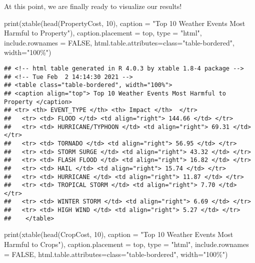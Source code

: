 \documentclass[
]{article}
\newenvironment{Shaded}{\begin{snugshade}}{\end{snugshade}}
\newcommand{\AttributeTok}[1]{\textcolor[rgb]{0.77,0.63,0.00}{#1}}
\newcommand{\ConstantTok}[1]{\textcolor[rgb]{0.00,0.00,0.00}{#1}}
\newcommand{\DecValTok}[1]{\textcolor[rgb]{0.00,0.00,0.81}{#1}}
\newcommand{\FunctionTok}[1]{\textcolor[rgb]{0.00,0.00,0.00}{#1}}
\newcommand{\NormalTok}[1]{#1}
\newcommand{\StringTok}[1]{\textcolor[rgb]{0.31,0.60,0.02}{#1}}
\begin{document}
At this point, we are finally ready to visualize our results!

\begin{Shaded}
\begin{Highlighting}[]
\FunctionTok{print}\NormalTok{(}\FunctionTok{xtable}\NormalTok{(}\FunctionTok{head}\NormalTok{(PropertyCost, }\DecValTok{10}\NormalTok{),}
             \AttributeTok{caption =} \StringTok{"Top 10 Weather Events Most Harmful to Property"}\NormalTok{),}
             \AttributeTok{caption.placement =} \StringTok{\textquotesingle{}top\textquotesingle{}}\NormalTok{,}
             \AttributeTok{type =} \StringTok{"html"}\NormalTok{,}
             \AttributeTok{include.rownames =} \ConstantTok{FALSE}\NormalTok{,}
             \AttributeTok{html.table.attributes=}\StringTok{\textquotesingle{}class="table{-}bordered", width="100\%"\textquotesingle{}}\NormalTok{)}
\end{Highlighting}
\end{Shaded}

\begin{verbatim}
## <!-- html table generated in R 4.0.3 by xtable 1.8-4 package -->
## <!-- Tue Feb  2 14:14:30 2021 -->
## <table class="table-bordered", width="100%">
## <caption align="top"> Top 10 Weather Events Most Harmful to Property </caption>
## <tr> <th> EVENT_TYPE </th> <th> Impact </th>  </tr>
##   <tr> <td> FLOOD </td> <td align="right"> 144.66 </td> </tr>
##   <tr> <td> HURRICANE/TYPHOON </td> <td align="right"> 69.31 </td> </tr>
##   <tr> <td> TORNADO </td> <td align="right"> 56.95 </td> </tr>
##   <tr> <td> STORM SURGE </td> <td align="right"> 43.32 </td> </tr>
##   <tr> <td> FLASH FLOOD </td> <td align="right"> 16.82 </td> </tr>
##   <tr> <td> HAIL </td> <td align="right"> 15.74 </td> </tr>
##   <tr> <td> HURRICANE </td> <td align="right"> 11.87 </td> </tr>
##   <tr> <td> TROPICAL STORM </td> <td align="right"> 7.70 </td> </tr>
##   <tr> <td> WINTER STORM </td> <td align="right"> 6.69 </td> </tr>
##   <tr> <td> HIGH WIND </td> <td align="right"> 5.27 </td> </tr>
##    </table>
\end{verbatim}

\begin{Shaded}
\begin{Highlighting}[]
\FunctionTok{print}\NormalTok{(}\FunctionTok{xtable}\NormalTok{(}\FunctionTok{head}\NormalTok{(CropCost, }\DecValTok{10}\NormalTok{),}
             \AttributeTok{caption =} \StringTok{"Top 10 Weather Events Most Harmful to Crops"}\NormalTok{),}
             \AttributeTok{caption.placement =} \StringTok{\textquotesingle{}top\textquotesingle{}}\NormalTok{,}
             \AttributeTok{type =} \StringTok{"html"}\NormalTok{,}
             \AttributeTok{include.rownames =} \ConstantTok{FALSE}\NormalTok{,}
             \AttributeTok{html.table.attributes=}\StringTok{\textquotesingle{}class="table{-}bordered", width="100\%"\textquotesingle{}}\NormalTok{)}
\end{Highlighting}
\end{Shaded}
\end{document}
